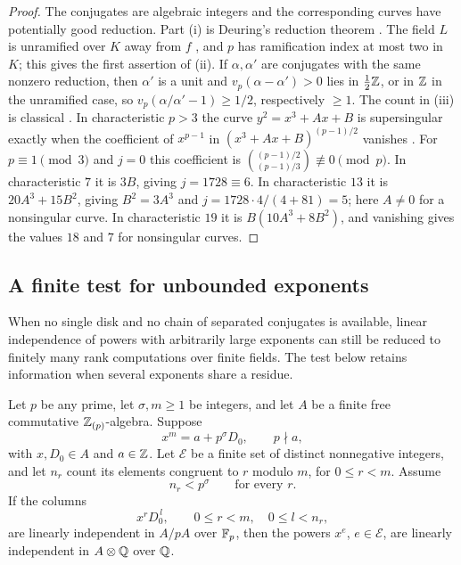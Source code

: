 \begin{proof}
The conjugates are algebraic integers and the corresponding curves have potentially good
reduction. Part (i) is Deuring's reduction theorem
\cite{Elkies2005Reduction,Belding2008Computing}. The field $L$ is unramified over $K$ away
from $f$ \cite{Cox2013Primes}, and $p$ has ramification index at most two in $K$; this
gives the first assertion of (ii). If $\alpha,\alpha'$ are conjugates with the same
nonzero reduction, then $\alpha'$ is a unit and $v_p(\alpha-\alpha')>0$ lies in
$\tfrac12\mathbb{Z}$, or in $\mathbb{Z}$ in the unramified case, so $v_p(\alpha/\alpha'-1)\ge1/2$,
respectively $\ge1$. The count in (iii) is classical
\cite{Elkies2005Reduction,Silverman2009Arithmetic}. In characteristic $p>3$ the curve
$y^2=x^3+Ax+B$ is supersingular exactly when the coefficient of $x^{p-1}$ in
$(x^3+Ax+B)^{(p-1)/2}$ vanishes \cite[Ch.~V, \S4]{Silverman2009Arithmetic}. For
$p\equiv1\pmod3$ and $j=0$ this coefficient is
$\binom{(p-1)/2}{(p-1)/3}\not\equiv0\pmod p$. In characteristic $7$ it is $3B$, giving
$j=1728\equiv6$. In characteristic $13$ it is $20A^3+15B^2$, giving $B^2=3A^3$ and
$j=1728\cdot4/(4+81)=5$; here $A\ne0$ for a nonsingular curve. In characteristic $19$
it is $B(10A^3+8B^2)$, and vanishing gives the values $18$ and $7$ for nonsingular
curves.
\end{proof}

\subsection{A finite test for unbounded exponents}\label{smd:sec:confluent}
{\raggedright{}}

When no single disk and no chain of separated conjugates is available, linear independence
of powers with arbitrarily large exponents can still be reduced to finitely many rank
computations over finite fields. The test below retains information when several
exponents share a residue.

\begin{theorem}\label{smd:thm:confluent}
Let $p$ be any prime, let $\sigma,m\ge1$ be integers, and let $A$ be a finite free
commutative $\mathbb{Z}_{(p)}$-algebra. Suppose
\[
 x^m=a+p^\sigma D_0,\qquad p\nmid a,
\]
with $x,D_0\in A$ and $a\in\mathbb{Z}$. Let $\mathcal E$ be a finite set of distinct nonnegative
integers, and let $n_r$ count its elements congruent to $r$ modulo $m$, for $0\le r<m$.
Assume
\begin{equation}\label{smd:eq:block}
 n_r<p^\sigma\qquad\text{for every }r .
\end{equation}
If the columns
\[
 x^rD_0^{\,l},\qquad0\le r<m,\quad0\le l<n_r,
\]
are linearly independent in $A/pA$ over $\mathbb{F}_p$, then the powers $x^e$, $e\in\mathcal E$,
are linearly independent in $A\otimes\mathbb{Q}$ over $\mathbb{Q}$.
\end{theorem}

